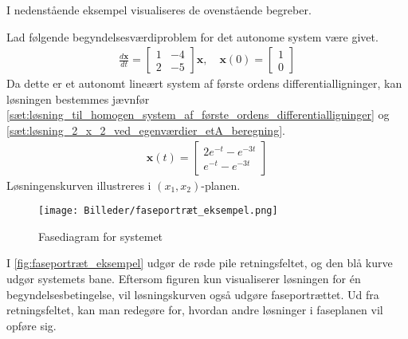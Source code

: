 I nedenstående eksempel visualiseres de ovenstående begreber.
\begin{eks}\textbf{}
\newline
Lad følgende begyndelsesværdiproblem for det autonome system være givet.
\begin{align*}
    \frac{d\textbf{x}}{dt}=\begin{bmatrix} 1 & -4 \\ 2 & -5 \end{bmatrix}\textbf{x}, \quad \textbf{x}(0)=\begin{bmatrix} 1 \\ 0 \end{bmatrix}
\end{align*}
Da dette er et autonomt lineært system af første ordens differentialligninger, kan løsningen bestemmes jævnfør \autoref{sæt:løsning_til_homogen_system_af_første_ordens_differentialligninger} og \autoref{sæt:løsning_2_x_2_ved_egenværdier_etA_beregning}.
%
\begin{align*}
    \textbf{x}(t)  = \begin{bmatrix} 2e^{-t}-e^{-3t} \\ e^{-t}-e^{-3t} \end{bmatrix}
\end{align*}
Løsningenskurven illustreres i $(x_1,x_2)$-planen.
%
\begin{figure}[H]
    \centering
    \texttt{[image: Billeder/faseportræt\_eksempel.png]}
    \caption{Fasediagram for systemet}
    \label{fig:faseportræt_eksempel}
\end{figure}
%
I \autoref{fig:faseportræt_eksempel} udgør de røde pile retningsfeltet, og den blå kurve udgør systemets bane. Eftersom figuren kun visualiserer løsningen for én begyndelsesbetingelse, vil løsningskurven også udgøre faseportrættet. Ud fra retningsfeltet, kan man redegøre for, hvordan andre løsninger i faseplanen vil opføre sig.
%
\end{eks}
